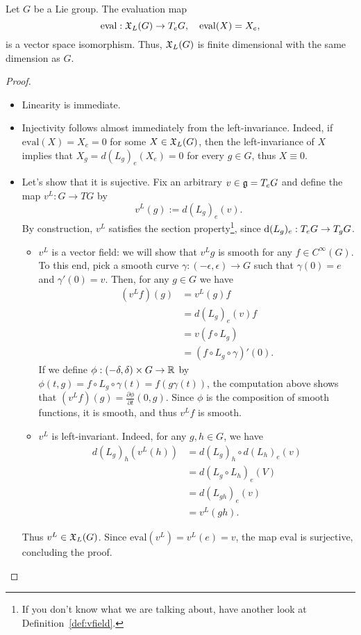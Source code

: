 \begin{theorem}
  Let $G$ be a Lie group. The evaluation map 
  \begin{equation}
    \mathrm{eval}:\mathfrak{X}_L(G)\to T_eG, \quad
    \mathrm{eval}(X) = X_e,
  \end{equation}
  is a vector space isomorphism.
  Thus, $\mathfrak{X}_L(G)$ is finite dimensional with the same dimension as $G$.
\end{theorem}
\begin{proof}
  \begin{itemize}
    \item Linearity is immediate.
    \item Injectivity follows almost immediately from the left-invariance. Indeed, if $\mathrm{eval}(X) = X_e = 0$ for some $X\in\mathfrak{X}_L(G)$, then the left-invariance of $X$ implies that $X_g = d(L_g)_e(X_e) = 0$ for every $g\in G$, thus $X\equiv0$.
    \item Let's show that it is sujective. Fix an arbitrary $v\in \mathfrak{g} = T_eG$ and define the map $v^L:G\to TG$ by
    \begin{equation}
      v^L(g) := d(L_g)_e(v).
    \end{equation}
    By construction, $v^L$ satisfies the section property\footnote{If you don't know what we are talking about, have another look at Definition~\ref{def:vfield}.}, since $\operatorname{d}(L_g)_e:T_eG\to T_gG$.
    \begin{itemize}
      \item $v^L$ is a vector field: we will show that $v^L g$ is smooth for any $f\in C^\infty(G)$.
      To this end, pick a smooth curve $\gamma:(-\epsilon,\epsilon)\to G$ such that $\gamma(0)=e$ and $\gamma'(0) = v$. Then, for any $g\in G$ we have
      \begin{align}
        (v^L f)(g) &= v^L(g) f \\
        &= d(L_g)_e(v) f\\
        &= v(f\circ L_g) \\
        &= (f\circ L_g\circ \gamma)'(0).
      \end{align}
      If we define $\phi:(-\delta, \delta)\times G \to \mathbb{R}$ by $\phi(t,g) = f\circ L_g\circ \gamma(t) = f(g\gamma(t))$, the computation above shows that $(v^Lf)(g) = \frac{\partial \phi}{\partial t}(0, g)$.
      Since $\phi$ is the composition of smooth functions, it is smooth, and thus $v^L f$ is smooth.
      \item $v^L$ is left-invariant. 
      Indeed, for any $g,h\in G$, we have
      \begin{align}
        d(L_g)_h(v^L(h)) &= d(L_g)_h\circ d(L_h)_e(v)\\ 
        &= d(L_g\circ L_h)_e(V)\\
        &= d(L_{gh})_e(v)\\
        &= v^L(gh).
      \end{align}
    \end{itemize}
    Thus $v^L\in\mathfrak{X}_L(G)$.
    Since $\mathrm{eval}(v^L) = v^L(e) = v$, the map $\mathrm{eval}$ is surjective, concluding the proof.
  \end{itemize}
\end{proof}

